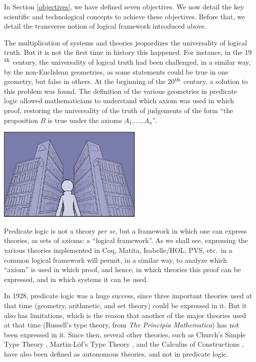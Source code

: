 
In Section \ref{objectives}, we have defined seven objectives. We now detail 
the key scientific and technological concepts to achieve these objectives. 
Before that, we detail the transverse notion of logical framework 
introduced above. 


The multiplication of systems and theories jeopardizes the
universality of logical truth. But it is not the first time in history
this happened.  For instance, in the 19$^{\mbox{\footnotesize th}}$
century, the universality of logical truth had been challenged, in a
similar way, by the non-Euclidean geometries, as some statements could
be true in one geometry, but false in others. At the beginning of the
20$^{\mbox{\footnotesize th}}$ century, a solution to this problem was
found.  The definition of the various geometries in predicate logic
\cite{HilbertAckermann} allowed mathematicians to understand which
axiom was used in which proof, restoring the universality of the truth
of judgements of the form ``the proposition $B$ is true under the
axioms $A_1, ..., A_n$''.

\begin{center}
\includegraphics[width=7cm]{img/Illustration4-reduced.jpg}
\end{center}

Predicate logic is not a theory {\em per se}, but a framework in
which one can express theories, as sets of axioms: a ``logical
framework''. As we shall see, expressing the various theories
implemented in Coq, Matita, Isabelle/HOL, PVS, etc.\ in a common
logical framework will permit, in a similar way, to analyze which
``axiom'' is used in which proof, and hence, in which theories this
proof can be expressed, and in which systems it can be used.

In 1928, predicate logic was a huge success, since three important
theories used at that time (geometry, arithmetic, and set theory)
could be expressed in it. But it also has limitations, which is the
reason that another of the major theories used at that time (Russell's
type theory, from {\em The Principia Mathematica}) has not been
expressed in it. Since then, several other theories, such as Church's
Simple Type Theory \cite{Church40}, Martin-L\"of's Type Theory
\cite{Martin-Lof84}, and the Calculus of Constructions
\cite{CoquandHuet88}, have also been defined as autonomous theories,
and not in predicate logic.

